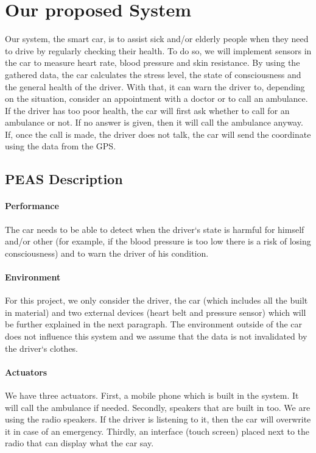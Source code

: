 \documentclass[a4paper]{article}
\begin{document}
\section{Our proposed System}
\indent
\indent Our system, the smart car, is to assist sick and/or elderly people when they need to drive by regularly checking their health.
To do so, we will implement sensors in the car to measure heart rate, blood pressure and skin resistance. By using the gathered data, the car calculates the stress level, the state of consciousness and the general health of the driver. With that, it can warn the driver to, depending on the situation, consider an appointment with a doctor or to call an ambulance. If the driver has too poor health, the car will first ask whether to call for an ambulance or not. If no answer is given, then it will call the ambulance anyway. If, once the call is made, the driver does not talk, the car will send the coordinate using the data from the GPS.
\subsection{PEAS Description}
\paragraph{Performance} The car needs to be able to detect when the driver`s state is harmful for himself and/or other (for example, if the blood pressure is too low there is a risk of losing consciousness) and to warn the driver of his condition.

\paragraph{Environment} For this project, we only consider the driver, the car (which includes all the built in material) and two external devices (heart belt and pressure sensor) which will be further explained in the next paragraph. The environment outside of the car does not influence this system and we assume that the data is not invalidated by the driver`s clothes.

\paragraph{Actuators} We have three actuators. First, a mobile phone which is built in the system. It will call the ambulance if needed. Secondly, speakers that are built in too. We are using the radio speakers. If the driver is listening to it, then the car will overwrite it in case of an emergency. Thirdly, an interface (touch screen) placed next to the radio that can display what the car say.
\end{document}
